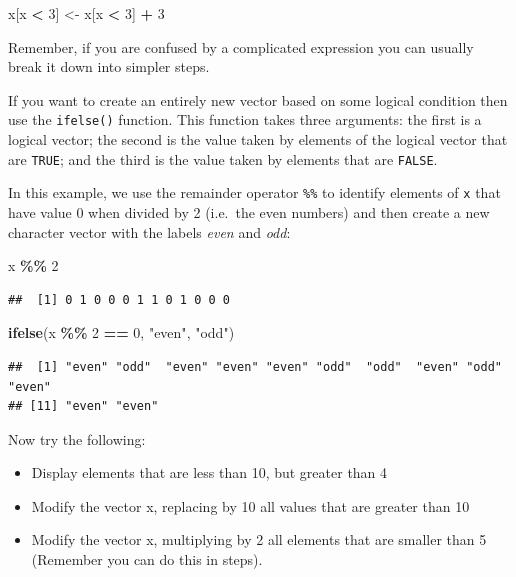 \documentclass[
]{book}
\newenvironment{Shaded}{\begin{snugshade}}{\end{snugshade}}
\newcommand{\DecValTok}[1]{\textcolor[rgb]{0.00,0.00,0.81}{#1}}
\newcommand{\FunctionTok}[1]{\textcolor[rgb]{0.13,0.29,0.53}{\textbf{#1}}}
\newcommand{\NormalTok}[1]{#1}
\newcommand{\OtherTok}[1]{\textcolor[rgb]{0.56,0.35,0.01}{#1}}
\newcommand{\SpecialCharTok}[1]{\textcolor[rgb]{0.81,0.36,0.00}{\textbf{#1}}}
\newcommand{\StringTok}[1]{\textcolor[rgb]{0.31,0.60,0.02}{#1}}
\providecommand{\tightlist}{%
  \setlength{\itemsep}{0pt}\setlength{\parskip}{0pt}}
\begin{document}
\begin{Shaded}
\begin{Highlighting}[]
\NormalTok{x[x }\SpecialCharTok{\textless{}} \DecValTok{3}\NormalTok{] }\OtherTok{\textless{}{-}}\NormalTok{ x[x }\SpecialCharTok{\textless{}} \DecValTok{3}\NormalTok{] }\SpecialCharTok{+} \DecValTok{3}
\end{Highlighting}
\end{Shaded}

Remember, if you are confused by a complicated expression you can usually
break it down into simpler steps.

If you want to create an entirely new vector based on some logical
condition then use the \texttt{ifelse()} function. This function takes
three arguments: the first is a logical vector; the second is the
value taken by elements of the logical vector that are \texttt{TRUE}; and
the third is the value taken by elements that are \texttt{FALSE}.

In this example, we use the remainder operator \texttt{\%\%} to identify
elements of \texttt{x} that have value 0 when divided by 2 (i.e.~the even numbers)
and then create a new character vector with the labels \emph{even} and \emph{odd}:

\begin{Shaded}
\begin{Highlighting}[]
\NormalTok{x }\SpecialCharTok{\%\%} \DecValTok{2}
\end{Highlighting}
\end{Shaded}

\begin{verbatim}
##  [1] 0 1 0 0 0 1 1 0 1 0 0 0
\end{verbatim}

\begin{Shaded}
\begin{Highlighting}[]
\FunctionTok{ifelse}\NormalTok{(x }\SpecialCharTok{\%\%} \DecValTok{2} \SpecialCharTok{==} \DecValTok{0}\NormalTok{, }\StringTok{"even"}\NormalTok{, }\StringTok{"odd"}\NormalTok{)}
\end{Highlighting}
\end{Shaded}

\begin{verbatim}
##  [1] "even" "odd"  "even" "even" "even" "odd"  "odd"  "even" "odd"  "even"
## [11] "even" "even"
\end{verbatim}

Now try the following:

\begin{itemize}
\tightlist
\item
  Display elements that are less than 10, but greater than 4
\item
  Modify the vector x, replacing by 10 all values that are greater than 10
\item
  Modify the vector x, multiplying by 2 all elements that are smaller than 5 (Remember you can do this in steps).
\end{itemize}
\end{document}
